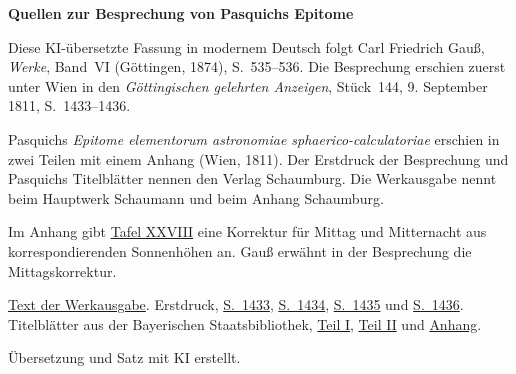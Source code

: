 \clearpage\thispagestyle{empty}
\begin{center}\textbf{Quellen zur Besprechung von Pasquichs Epitome}\end{center}
\noindent Diese KI-übersetzte Fassung in modernem Deutsch folgt Carl Friedrich Gauß, \textit{Werke}, Band~VI (Göttingen, 1874), S.~535--536. Die Besprechung erschien zuerst unter Wien in den \textit{Göttingischen gelehrten Anzeigen}, Stück~144, 9. September 1811, S.~1433--1436.
\par\smallskip\noindent Pasquichs \textit{Epitome elementorum astronomiae sphaerico-calculatoriae} erschien in zwei Teilen mit einem Anhang (Wien, 1811). Der Erstdruck der Besprechung und Pasquichs Titelblätter nennen den Verlag Schaumburg. Die Werkausgabe nennt beim Hauptwerk Schaumann und beim Anhang Schaumburg.
\par\smallskip\noindent Im Anhang gibt \href{https://api.digitale-sammlungen.de/iiif/image/v2/bsb10049414_00029/full/1250,/0/default.jpg}{Tafel XXVIII} eine Korrektur für Mittag und Mitternacht aus korrespondierenden Sonnenhöhen an. Gauß erwähnt in der Besprechung die Mittagskorrektur.
\par\smallskip\noindent \href{https://gdz.sub.uni-goettingen.de/id/PPN236007467}{Text der Werkausgabe}. Erstdruck, \href{https://images.p.sub.uni-goettingen.de/iiif/image/gdz:PPN319721507_1811:00001467/full/1650,/0/default.jpg}{S.~1433}, \href{https://images.p.sub.uni-goettingen.de/iiif/image/gdz:PPN319721507_1811:00001468/full/1650,/0/default.jpg}{S.~1434}, \href{https://images.p.sub.uni-goettingen.de/iiif/image/gdz:PPN319721507_1811:00001469/full/1650,/0/default.jpg}{S.~1435} und \href{https://images.p.sub.uni-goettingen.de/iiif/image/gdz:PPN319721507_1811:00001470/full/1650,/0/default.jpg}{S.~1436}. Titelblätter aus der Bayerischen Staatsbibliothek, \href{https://api.digitale-sammlungen.de/iiif/image/v2/bsb10049412_00005/full/1250,/0/default.jpg}{Teil I}, \href{https://api.digitale-sammlungen.de/iiif/image/v2/bsb10049413_00005/full/1250,/0/default.jpg}{Teil II} und \href{https://api.digitale-sammlungen.de/iiif/image/v2/bsb10049414_00003/full/1250,/0/default.jpg}{Anhang}.
\par\smallskip\noindent Übersetzung und Satz mit KI erstellt.
\clearpage
